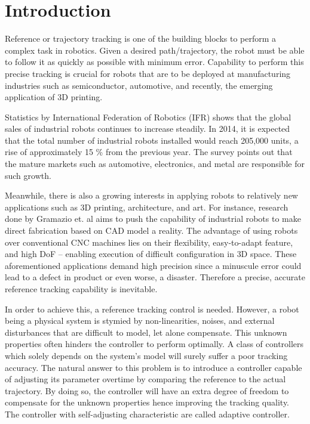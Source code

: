 %
\chapter{Introduction} \label{chap::intro}
Reference or trajectory tracking is one of the building blocks to perform a complex task in robotics. Given a desired path/trajectory, the robot must be able to follow it as quickly as possible with minimum error. Capability to perform this precise tracking is crucial for robots that are to be deployed at manufacturing industries such as semiconductor, automotive, and recently, the emerging application of 3D printing. 

Statistics by International Federation of Robotics (IFR) \cite{IFR2014} shows that the global sales of industrial robots continues to increase steadily. In 2014, it is expected that the total number of industrial robots installed would reach 205,000 units, a rise of approximately 15 \% from the previous year. The survey points out that the mature markets such as automotive, electronics, and metal are responsible for such growth. 

Meanwhile, there is also a growing interests in applying robots to relatively new applications such as 3D printing, architecture, and art. For instance, research done by Gramazio et. al \cite{Helm2014} \cite{Lloret2014} aims to push the capability of industrial robots to make direct fabrication based on CAD model a reality. The advantage of using robots over conventional CNC machines lies on their flexibility, easy-to-adapt feature, and high \ac{DoF} -- enabling execution of difficult configuration in \ac{3D} space. These aforementioned applications demand high precision since a minuscule error could lead to a defect in product or even worse, a disaster. Therefore a precise, accurate reference tracking capability is inevitable.

In order to achieve this, a reference tracking control is needed. However, a robot being a physical system is stymied by non-linearities, noises, and external disturbances that are difficult to model, let alone compensate. This unknown properties often hinders the controller to perform optimally. A class of controllers which solely depends on the system's model will surely suffer a poor tracking accuracy. The natural answer to this problem is to introduce a controller capable of adjusting its parameter overtime by comparing the reference to the actual trajectory. By doing so, the controller will have an extra degree of freedom to compensate for the unknown properties hence improving the tracking quality. The controller with self-adjusting characteristic are called adaptive controller.

